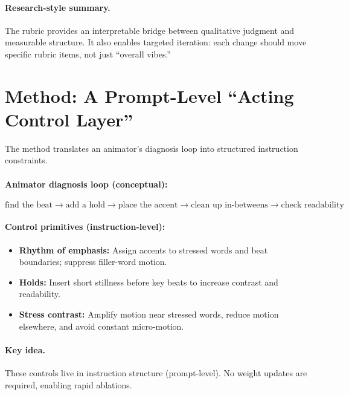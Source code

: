 \documentclass[11pt,a4paper]{article}
\begin{document}
\paragraph{Research-style summary.} The rubric provides an interpretable bridge between qualitative judgment and measurable structure. It also enables targeted iteration: each change should move specific rubric items, not just ``overall vibes.''

\section{Method: A Prompt-Level ``Acting Control Layer''}

The method translates an animator's diagnosis loop into structured instruction constraints.

\paragraph{Animator diagnosis loop (conceptual):}
\[
\text{find the beat} \rightarrow \text{add a hold} \rightarrow \text{place the accent} \rightarrow \text{clean up in-betweens} \rightarrow \text{check readability}
\]

\paragraph{Control primitives (instruction-level):}

\begin{itemize}[leftmargin=2em]
    \item \textbf{Rhythm of emphasis:} Assign accents to stressed words and beat boundaries; suppress filler-word motion.
    \item \textbf{Holds:} Insert short stillness before key beats to increase contrast and readability.
    \item \textbf{Stress contrast:} Amplify motion near stressed words, reduce motion elsewhere, and avoid constant micro-motion.
\end{itemize}

\paragraph{Key idea.} These controls live in instruction structure (prompt-level). No weight updates are required, enabling rapid ablations.
\end{document}
